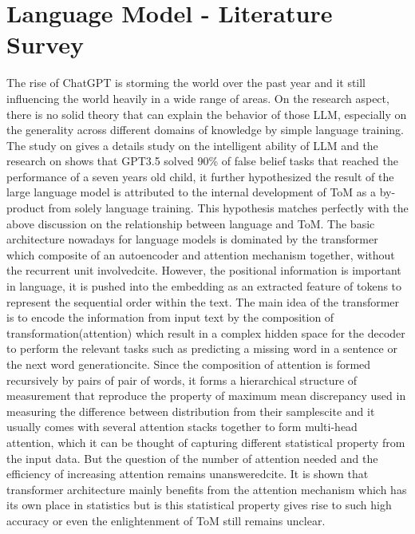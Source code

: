 \documentclass[12pt]{article}
\begin{document}
\section{Language Model - Literature Survey} 
The rise of ChatGPT is storming the world over the past year and it still influencing the world heavily in a wide range of areas. On the research aspect, there is no solid theory that can explain the behavior of those LLM, especially on the generality across different domains of knowledge by simple language training\cite{Bubeck_2023}. The study on\cite{Bubeck_2023} gives a details study on the intelligent ability of LLM and the research on \cite{Kosinski_2023} shows that GPT3.5 solved 90\% of false belief tasks that reached the performance of a seven years old child, it further hypothesized the result of the large language model is attributed to the internal development of ToM as a by-product from solely language training. This hypothesis matches perfectly with the above discussion on the relationship between language and ToM. 
The basic architecture nowadays for language models is dominated by the transformer which composite of an autoencoder and attention mechanism together, without the recurrent unit involved{cite}. However, the positional information is important in language, it is pushed into the embedding as an extracted feature of tokens to represent the sequential order within the text. The main idea of the transformer is to encode the information from input text by the composition of transformation(attention) which result in a complex hidden space for the decoder to perform the relevant tasks such as predicting a missing word in a sentence or the next word generation{cite}. Since the composition of attention is formed recursively by pairs of pair of words, it forms a hierarchical structure of measurement that reproduce the property of maximum mean discrepancy used in measuring the difference between distribution from their samples{cite} and it usually comes with several attention stacks together to form multi-head attention, which it can be thought of capturing different statistical property from the input data. 
But the question of the number of attention needed and the efficiency of increasing attention remains unanswered{cite}. 
It is shown that transformer architecture mainly benefits from the attention mechanism which has its own place in statistics but is this statistical property gives rise to such high accuracy or even the enlightenment of ToM still remains unclear.

\newpage
\end{document}
